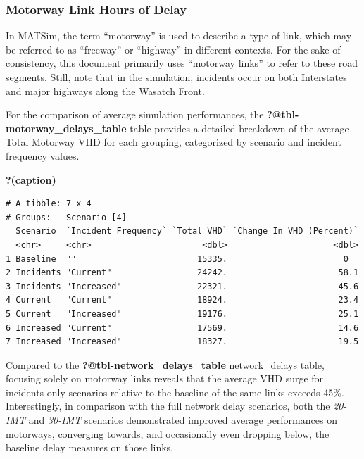 \documentclass[
  letterpaper,
  authoryear]{elsarticle}
\begin{document}
\hypertarget{motorway-link-hours-of-delay}{%
\subsubsection{Motorway Link Hours of
Delay}\label{motorway-link-hours-of-delay}}

In MATSim, the term ``motorway'' is used to describe a type of link,
which may be referred to as ``freeway'' or ``highway'' in different
contexts. For the sake of consistency, this document primarily uses
``motorway links'' to refer to these road segments. Still, note that in
the simulation, incidents occur on both Interstates and major highways
along the Wasatch Front.

For the comparison of average simulation performances, the
\textbf{?@tbl-motorway\_delays\_table} table provides a detailed
breakdown of the average Total Motorway VHD for each grouping,
categorized by scenario and incident frequency values.

\begin{table}

\caption{\textbf{?(caption)}}\begin{minipage}[t]{\linewidth}

{\centering 

\begin{verbatim}
# A tibble: 7 x 4
# Groups:   Scenario [4]
  Scenario  `Incident Frequency` `Total VHD` `Change In VHD (Percent)`
  <chr>     <chr>                      <dbl>                     <dbl>
1 Baseline  ""                        15335.                       0  
2 Incidents "Current"                 24242.                      58.1
3 Incidents "Increased"               22321.                      45.6
4 Current   "Current"                 18924.                      23.4
5 Current   "Increased"               19176.                      25.1
6 Increased "Current"                 17569.                      14.6
7 Increased "Increased"               18327.                      19.5
\end{verbatim}

}

\end{minipage}%

\end{table}

Compared to the \textbf{?@tbl-network\_delays\_table} network\_delays
table, focusing solely on motorway links reveals that the average VHD
surge for incidents-only scenarios relative to the baseline of the same
links exceeds 45\%. Interestingly, in comparison with the full network
delay scenarios, both the \emph{20-IMT} and \emph{30-IMT} scenarios
demonstrated improved average performances on motorways, converging
towards, and occasionally even dropping below, the baseline delay
measures on those links.
\end{document}
